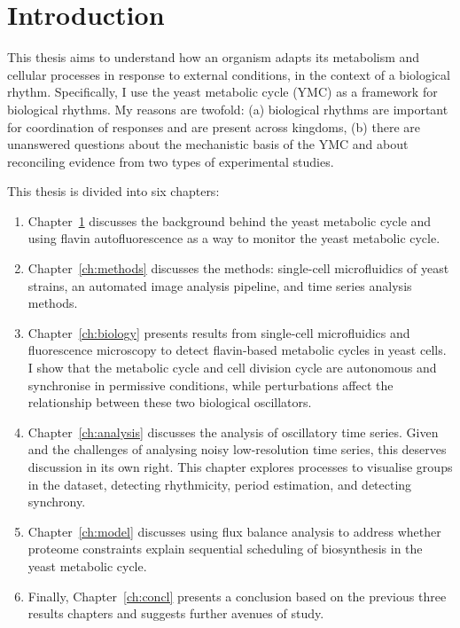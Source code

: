 \chapter{Introduction}
\label{ch:intro}

This thesis aims to understand how an organism adapts its metabolism and cellular processes in response to external conditions, in the context of a biological rhythm.
Specifically, I use the yeast metabolic cycle (YMC) as a framework for biological rhythms.
My reasons are twofold: (a) biological rhythms are important for coordination of responses and are present across kingdoms, (b) there are unanswered questions about the mechanistic basis of the YMC and about reconciling evidence from two types of experimental studies.

This thesis is divided into six chapters:
\begin{enumerate}
  \item Chapter~\ref{ch:intro} discusses the background behind the yeast metabolic cycle and using flavin autofluorescence as a way to monitor the yeast metabolic cycle.
  \item Chapter~\ref{ch:methods} discusses the methods: single-cell microfluidics of yeast strains, an automated image analysis pipeline, and time series analysis methods.
  \item Chapter~\ref{ch:biology} presents results from single-cell microfluidics and fluorescence microscopy to detect flavin-based metabolic cycles in yeast cells.
        I show that the metabolic cycle and cell division cycle are autonomous and synchronise in permissive conditions, while perturbations affect the relationship between these two biological oscillators.
  \item Chapter~\ref{ch:analysis} discusses the analysis of oscillatory time series.
        Given and the challenges of analysing noisy low-resolution time series, this deserves discussion in its own right.
        This chapter explores processes to visualise groups in the dataset, detecting rhythmicity, period estimation, and detecting synchrony.
  \item Chapter~\ref{ch:model} discusses using flux balance analysis to address whether proteome constraints explain sequential scheduling of biosynthesis in the yeast metabolic cycle.
  \item Finally, Chapter~\ref{ch:concl} presents a conclusion based on the previous three results chapters and suggests further avenues of study.
\end{enumerate}

